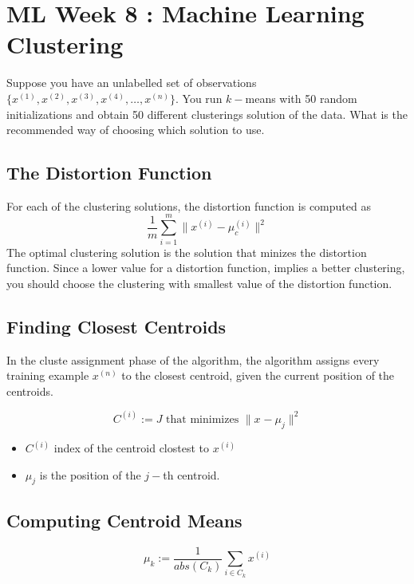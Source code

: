 \documentclass[11pt]{article} %
\begin{document}
	

\newpage
\section{ML Week 8 : Machine Learning Clustering}

Suppose you have an unlabelled set of observations$\{ x^{(1)},x^{(2)},x^{(3)},x^{(4)}, \ldots ,x^{(n)}\}$.
You run $k-$means with 50 random initializations and obtain 50 different clusterings solution of the data.
What is the recommended way of choosing which solution to use.

\subsection{The Distortion Function}
For each of the clustering solutions, the distortion function is computed as 
\[ \frac{1}{m} \sum^{m}_{i=1} \parallel x^{(i)} - \mu_c^{(i)}\parallel ^2 \]
The optimal clustering solution is the solution that minizes the distortion function.
Since a lower value for a distortion function, implies a better clustering, you should choose the clustering with 
smallest value of the distortion function.
\subsection*{Finding Closest Centroids}

In the cluste assignment phase of the algorithm, the algorithm assigns every training example $x^{(n)}$ to the closest 
centroid, given the current position of the centroids.

\[ C^{(i)} := J \mbox{ that minimizes } \| x^{} - \mu_j \| ^2 \]

\begin{itemize}
	\item $C^{(i)}$ index of the centroid clostest to $x^{(i)}$
	\item $\mu_j$ is the position of the $j-$th centroid.
\end{itemize}

\subsection{Computing Centroid Means}

\[ 
\mu_k := \frac{1}{abs(C_k)} \sum_{i \in C_k} x^{(i)}
\]
\end{document}
